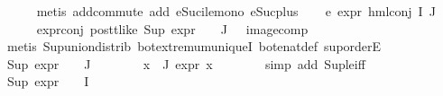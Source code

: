 \begin{isabellebody}
\ \ \ \ \isamarkupfalse%
\ {\isacharparenleft}{\kern0pt}metis\ add{\isachardot}{\kern0pt}commute\ add{\isacharunderscore}{\kern0pt}{}\ eSuc{\isacharunderscore}{\kern0pt}ile{\isacharunderscore}{\kern0pt}mono\ eSuc{\isacharunderscore}{\kern0pt}plus{\isacharunderscore}{\kern0pt}{}{\isacharparenright}{\kern0pt}\isanewline
\ \ \isamarkupfalse%
\ e{}{\isacharcolon}{\kern0pt}\ {\isachardoublequoteopen}expr{\isacharunderscore}{\kern0pt}{}\ {\isacharparenleft}{\kern0pt}hml{\isacharunderscore}{\kern0pt}conj\ I\ J\ {\isasymPhi}{\isacharparenright}{\kern0pt}\ {\isacharequal}{\kern0pt}\ {}{\isachardoublequoteclose}\isanewline
\ \ \ \ \isamarkupfalse%
\ expr{\isacharunderscore}{\kern0pt}{}{\isacharunderscore}{\kern0pt}conj\ pos{\isacharunderscore}{\kern0pt}tt{\isacharunderscore}{\kern0pt}like\ {\isacartoucheopen}Sup\ {\isacharparenleft}{\kern0pt}expr{\isacharunderscore}{\kern0pt}{}\ {\isacharbackquote}{\kern0pt}\ {\isasymPhi}\ {\isacharbackquote}{\kern0pt}\ J{\isacharparenright}{\kern0pt}\ {\isacharequal}{\kern0pt}\ {}{\isacartoucheclose}\ image{\isacharunderscore}{\kern0pt}comp\isanewline
\ \ \ \ \isamarkupfalse%
\ {\isacharparenleft}{\kern0pt}metis\ Sup{\isacharunderscore}{\kern0pt}union{\isacharunderscore}{\kern0pt}distrib\ bot{\isachardot}{\kern0pt}extremum{\isacharunderscore}{\kern0pt}uniqueI\ bot{\isacharunderscore}{\kern0pt}enat{\isacharunderscore}{\kern0pt}def\ sup{\isachardot}{\kern0pt}orderE{\isacharparenright}{\kern0pt}\isanewline
\ \ \isamarkupfalse%
\ {\isachardoublequoteopen}Sup\ {\isacharparenleft}{\kern0pt}expr{\isacharunderscore}{\kern0pt}{}\ {\isacharbackquote}{\kern0pt}\ {\isasymPhi}\ {\isacharbackquote}{\kern0pt}\ J{\isacharparenright}{\kern0pt}\ {\isasymle}\ {}{\isachardoublequoteclose}\isanewline
\ \ \ \ \isamarkupfalse%
\ {\isacartoucheopen}{\isasymforall}x{\isasymin}{\isasymPhi}\ {\isacharbackquote}{\kern0pt}\ J{\isachardot}{\kern0pt}\ expr{\isacharunderscore}{\kern0pt}{}\ x\ {\isacharequal}{\kern0pt}\ {}{\isacartoucheclose}\isanewline
\ \ \ \ \isamarkupfalse%
\ {\isacharparenleft}{\kern0pt}simp\ add{\isacharcolon}{\kern0pt}\ Sup{\isacharunderscore}{\kern0pt}le{\isacharunderscore}{\kern0pt}iff{\isacharparenright}{\kern0pt}\isanewline
\ \ \isamarkupfalse%
\ {\isachardoublequoteopen}Sup\ {\isacharparenleft}{\kern0pt}expr{\isacharunderscore}{\kern0pt}{}\ {\isacharbackquote}{\kern0pt}\ {\isasymPhi}\ {\isacharbackquote}{\kern0pt}\ I{\isacharparenright}{\kern0pt}\ {\isasymle}\ {}{\isachardoublequoteclose}\isanewline

\end{isabellebody}
